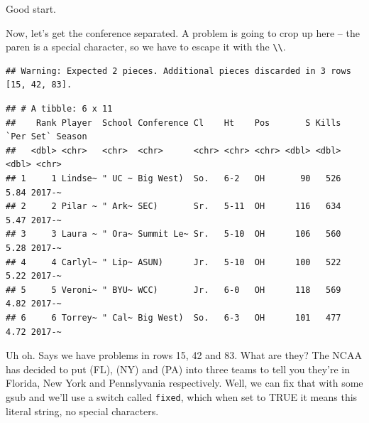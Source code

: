 \documentclass[
]{book}
\newenvironment{Shaded}{\begin{snugshade}}{\end{snugshade}}
\newcommand{\CharTok}[1]{\textcolor[rgb]{0.31,0.60,0.02}{#1}}
\newcommand{\DataTypeTok}[1]{\textcolor[rgb]{0.13,0.29,0.53}{#1}}
\newcommand{\KeywordTok}[1]{\textcolor[rgb]{0.13,0.29,0.53}{\textbf{#1}}}
\newcommand{\NormalTok}[1]{#1}
\newcommand{\OperatorTok}[1]{\textcolor[rgb]{0.81,0.36,0.00}{\textbf{#1}}}
\newcommand{\StringTok}[1]{\textcolor[rgb]{0.31,0.60,0.02}{#1}}
\begin{document}
Good start.

Now, let's get the conference separated. A problem is going to crop up here -- the paren is a special character, so we have to escape it with the \texttt{\textbackslash{}\textbackslash{}}.

\begin{Shaded}
\end{Shaded}

\begin{verbatim}
## Warning: Expected 2 pieces. Additional pieces discarded in 3 rows [15, 42, 83].
\end{verbatim}

\begin{verbatim}
## # A tibble: 6 x 11
##    Rank Player  School Conference Cl    Ht    Pos       S Kills `Per Set` Season
##   <dbl> <chr>   <chr>  <chr>      <chr> <chr> <chr> <dbl> <dbl>     <dbl> <chr> 
## 1     1 Lindse~ " UC ~ Big West)  So.   6-2   OH       90   526      5.84 2017-~
## 2     2 Pilar ~ " Ark~ SEC)       Sr.   5-11  OH      116   634      5.47 2017-~
## 3     3 Laura ~ " Ora~ Summit Le~ Sr.   5-10  OH      106   560      5.28 2017-~
## 4     4 Carlyl~ " Lip~ ASUN)      Jr.   5-10  OH      100   522      5.22 2017-~
## 5     5 Veroni~ " BYU~ WCC)       Jr.   6-0   OH      118   569      4.82 2017-~
## 6     6 Torrey~ " Cal~ Big West)  So.   6-3   OH      101   477      4.72 2017-~
\end{verbatim}

Uh oh. Says we have problems in rows 15, 42 and 83. What are they? The NCAA has decided to put (FL), (NY) and (PA) into three teams to tell you they're in Florida, New York and Pennslyvania respectively. Well, we can fix that with some gsub and we'll use a switch called \texttt{fixed}, which when set to TRUE it means this literal string, no special characters.
\end{document}
